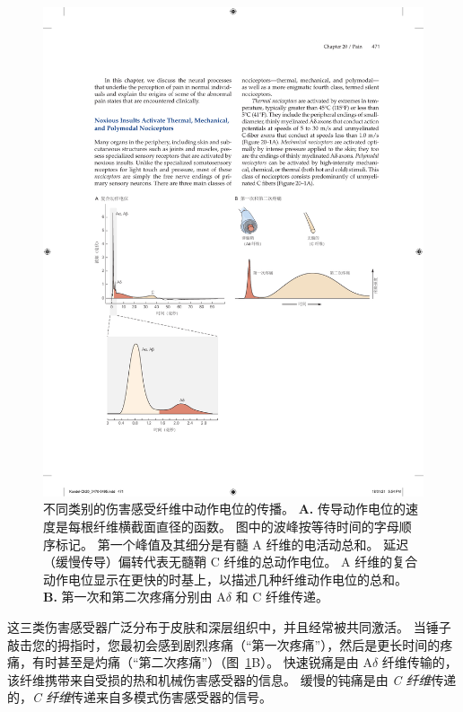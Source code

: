 \begin{figure}[htbp]
	\centering
	\includegraphics[width=1.0\linewidth]{chap20/fig_20_1}
	\caption{不同类别的伤害感受纤维中动作电位的传播。 
		\textbf{A.} 传导动作电位的速度是每根纤维横截面直径的函数。
		图中的波峰按等待时间的字母顺序标记。
		第一个峰值及其细分是有髓 A 纤维的电活动总和。
		延迟（缓慢传导）偏转代表无髓鞘 C 纤维的总动作电位。
		A 纤维的复合动作电位显示在更快的时基上，以描述几种纤维动作电位的总和\cite{perl2007ideas}。
		\textbf{B.} 第一次和第二次疼痛分别由 A$\delta$ 和 C 纤维传递\cite{fields1987painful}。}
	\label{fig:20_1}
\end{figure}


这三类伤害感受器广泛分布于皮肤和深层组织中，并且经常被共同激活。
当锤子敲击您的拇指时，您最初会感到剧烈疼痛（“第一次疼痛”），然后是更长时间的疼痛，有时甚至是灼痛（“第二次疼痛”）（图~\ref{fig:20_1}B）。
快速锐痛是由 A$ \delta $ 纤维传输的，该纤维携带来自受损的热和机械伤害感受器的信息。
缓慢的钝痛是由 \textit{C 纤维}传递的，\textit{C 纤维}传递来自多模式伤害感受器的信号。


